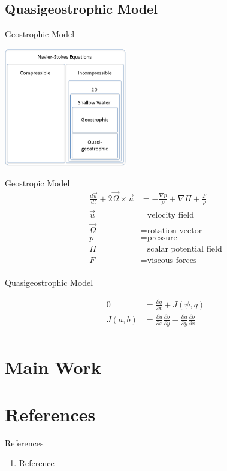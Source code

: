 \documentclass{beamer}
\begin{document}
		\subsection{Quasigeostrophic Model}
			\begin{frame}[t]{Geostrophic Model}
				\begin{center}
					\includegraphics[width=0.4\textwidth]{nested_models_qg.png}
				\end{center}
			\end{frame}
			\begin{frame}[t]{Geostropic Model}
				\begin{align*}
					\frac{d \vec u}{dt} + 2 \vec \Omega \times \vec u &= -\frac{\nabla p}{\rho} + \nabla \Pi + \frac{F}{\rho}\\
					\vec u &= \text{velocity field}\\
					\vec \Omega &= \text{rotation vector}\\
					p &= \text{pressure}\\
					\Pi &= \text{scalar potential field}\\
					F &= \text{viscous forces}\\
				\end{align*}
			\end{frame}
			\begin{frame}[t]{Quasigeostrophic Model}
				\begin{center}
					\begin{align*}
						0 &=\frac{\partial q}{\partial t} + J(\psi, q) \\
						J(a, b) &=\frac{\partial a}{\partial x}\frac{\partial b}{\partial y} - \frac{\partial a}{\partial y}\frac{\partial b}{\partial x} \\
					\end{align*}
				\end{center}
			\end{frame}

	\section{Main Work}

	\section{References}
		\begin{frame}{References}
			\begin{enumerate}
				\item Reference
			\end{enumerate}
		\end{frame}
\end{document}
